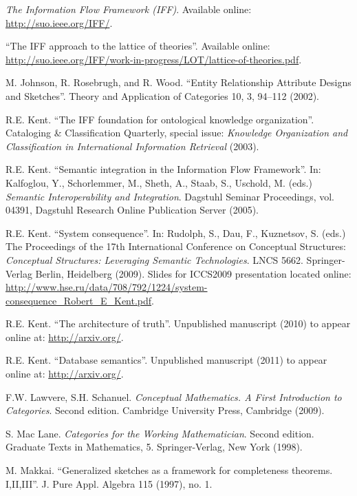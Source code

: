 \documentclass{amsart}
\theoremstyle{remark}
\theoremstyle{definition}
\begin{document}
\begin{thebibliography}{JTT}
{\em The Information Flow Framework (IFF)}.
Available online: \url{http://suo.ieee.org/IFF/}.

``The IFF approach to the lattice of theories''.
Available online: \url{http://suo.ieee.org/IFF/work-in-progress/LOT/lattice-of-theories.pdf}.

 M. Johnson, R. Rosebrugh, and R. Wood.
``Entity Relationship Attribute Designs and Sketches''.
Theory and Application of Categories 10, 3, 94--112 (2002). 

 R.E. Kent. 
``The IFF foundation for ontological knowledge organization''.
Cataloging \& Classification Quarterly, special issue: {\em Knowledge Organization and Classification in International Information Retrieval} (2003).

 R.E. Kent. 
``Semantic integration in the Information Flow Framework''.
In: Kalfoglou, Y., Schorlemmer, M., Sheth, A., Staab, S., Uschold, M. (eds.)
{\em Semantic Interoperability and Integration}.
Dagstuhl Seminar Proceedings, vol. 04391, Dagstuhl Research Online Publication Server (2005).

 R.E. Kent. 
``System consequence''.
In: Rudolph, S., Dau, F., Kuznetsov, S. (eds.)
The Proceedings of the 17th International Conference on Conceptual Structures: 
{\em Conceptual Structures: Leveraging Semantic Technologies}. LNCS 5662. Springer-Verlag Berlin, Heidelberg (2009).
Slides for ICCS2009 presentation located online:  \url{http://www.hse.ru/data/708/792/1224/system-consequence_Robert_E_Kent.pdf}.

 R.E. Kent. 
``The architecture of truth''.
Unpublished manuscript (2010) to appear online at: \url{http://arxiv.org/}.

 R.E. Kent. 
``Database semantics''.
Unpublished manuscript (2011) to appear online at: \url{http://arxiv.org/}.

 F.W. Lawvere, S.H. Schanuel. 
{\em Conceptual Mathematics. A First Introduction to Categories}. 
Second edition. Cambridge University Press, Cambridge (2009).

 S. Mac Lane. 
{\em Categories for the Working Mathematician}. Second edition. 
Graduate Texts in Mathematics, 5. Springer-Verlag, New York (1998).

 M. Makkai. 
``Generalized sketches as a framework for completeness theorems. I,II,III''. 
J. Pure Appl. Algebra 115 (1997), no. 1.


\end{thebibliography}
\end{document}
